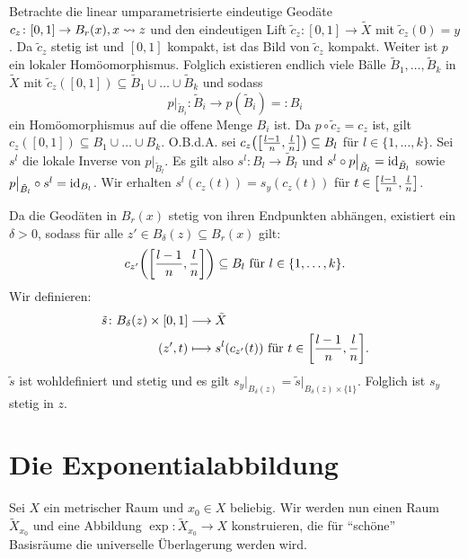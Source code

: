 \begin{beweis}
\begin{itemize}
		Betrachte die linear umparametrisierte eindeutige Geodäte $c_z \colon [0,1] \rightarrow B_r(x), x \geo z$ und den eindeutigen Lift $\tilde{c}_z \colon [0,1] \rightarrow \tilde{X}$ mit $\tilde{c}_z(0) = y$. 
		Da $\tilde{c}_z$ stetig ist und $[0,1]$ kompakt, ist das Bild von $\tilde{c}_z$ kompakt.
		Weiter ist $p$ ein lokaler Homöomorphismus.
		Folglich existieren endlich viele Bälle $\tilde{B}_1, \dots, \tilde{B}_k$ in $\tilde{X}$ mit $\tilde{c}_z([0,1]) \subseteq \tilde{B}_1 \cup \dots \cup \tilde{B}_k$ und sodass
		\[
			p \big|_{\tilde{B}_i} \colon \tilde{B}_i \longrightarrow p(\tilde{B}_i) =: B_i
		\]
		ein Homöomorphismus auf die offene Menge $B_i$ ist.
		Da $p \circ \tilde{c}_z = c_z$ ist, gilt $c_z([0,1]) \subseteq B_1 \cup \dots \cup B_k$. 
		O.B.d.A. sei $c_z \enbrace*{\benbrace*{\frac{l-1}{n},\frac{l}{n}}} \subseteq B_l$ für $l \in \{1,\dots,k\}$.
		Sei $s^l$ die lokale Inverse von $p \big|_{\tilde{B}_l}$.
		Es gilt also $s^l \colon B_l \rightarrow \tilde{B}_l$ und $s^l \circ p \big|_{\tilde{B}_l} = \id_{\tilde{B}_l}$ sowie $p \big|_{\tilde{B}_l} \circ s^l = \id_{B_l}$.
		Wir erhalten $s^l(c_z(t)) = s_y(c_z(t))$ für $t \in \benbrace*{\frac{l-1}{n},\frac{l}{n}}$. 
		
		Da die Geodäten in $B_r(x)$ stetig von ihren Endpunkten abhängen, existiert ein $\delta > 0$, sodass für alle $z' \in B_\delta(z) \subseteq B_r(x)$ gilt:
		\[
			c_{z'} \enbrace*{\benbrace*{\frac{l-1}{n},\frac{l}{n}}} \subseteq B_l \text{ für } l \in \{1,\dots,k\}.
		\]
		Wir definieren:
		\begin{align*}
			\tilde{s}\colon B_\delta(z) \times [0,1] &\longrightarrow \tilde{X} \\
			(z',t) &\longmapsto s^l(c_{z'}(t)) \text{ für } t \in \benbrace*{\frac{l-1}{n},\frac{l}{n}}.
		\end{align*}
		$\tilde{s}$ ist wohldefiniert und stetig und es gilt $s_y \big|_{B_\delta(z)} = \tilde{s} \big|_{B_\delta(z) \times \{1\}}$.
		Folglich ist $s_y$ stetig in $z$. \qedhere	
	\end{itemize}
\end{beweis}

\section{Die Exponentialabbildung}
\label{sec:2.3}
	Sei $X$ ein metrischer Raum und $x_0 \in X$ beliebig. 
	Wir werden nun einen Raum $\tilde{X}_{x_0}$ und eine Abbildung $\exp\colon \tilde{X}_{x_0} \rightarrow X$ konstruieren, die für \enquote{schöne} Basisräume die universelle Überlagerung werden wird.
	
